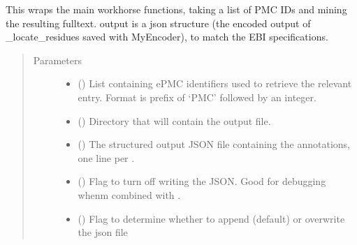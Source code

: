 \documentclass[letterpaper,10pt,english]{sphinxmanual}
\begin{document}
\begin{fulllineitems}
\label{\detokenize{functions:pyresid.process}}
This wraps the main workhorse functions, taking a list of PMC IDs and mining the resulting fulltext.
output is a json structure (the encoded output of \_locate\_residues saved with MyEncoder), to match
the EBI specifications.
\begin{quote}\begin{description}
\item[{Parameters}] \leavevmode\begin{itemize}
\item {} 
 () \textendash{} List containing ePMC identifiers used to retrieve the relevant entry. Format is prefix of ‘PMC’
followed by an integer.

\item {} 
 () \textendash{} Directory that will contain the output file.

\item {} 
 () \textendash{} The structured output JSON file containing the annotations, one line per .

\item {} 
 (\sphinxstyleliteralemphasis{\sphinxupquote{, }}\sphinxstyleliteralemphasis{\sphinxupquote{, }}) \textendash{} Flag to turn off writing the  JSON. Good for debugging whenm combined with .

\item {} 
 (\sphinxstyleliteralemphasis{\sphinxupquote{, }}\sphinxstyleliteralemphasis{\sphinxupquote{, }}) \textendash{} Flag to determine whether to append (default) or overwrite the json file


\end{itemize}
\end{description}
\end{quote}
\end{fulllineitems}
\end{document}
